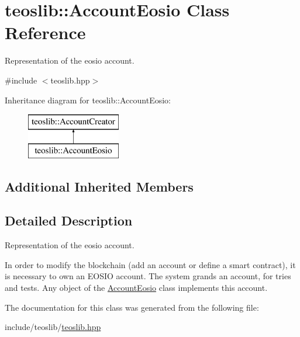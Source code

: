\hypertarget{classteoslib_1_1_account_eosio}{}\section{teoslib\+:\+:Account\+Eosio Class Reference}
\label{classteoslib_1_1_account_eosio}


Representation of the eosio account.  




{\ttfamily \#include $<$teoslib.\+hpp$>$}

Inheritance diagram for teoslib\+:\+:Account\+Eosio\+:\begin{figure}[H]
\begin{center}
\leavevmode
\includegraphics[height=2.000000cm]{classteoslib_1_1_account_eosio}
\end{center}
\end{figure}
\subsection*{Additional Inherited Members}


\subsection{Detailed Description}
Representation of the eosio account. 

In order to modify the blockchain (add an account or define a smart contract), it is necessary to own an E\+O\+S\+IO account. The system grands an account, for tries and tests. Any object of the \mbox{\hyperlink{classteoslib_1_1_account_eosio}{Account\+Eosio}} class implements this account. 

The documentation for this class was generated from the following file\+:\begin{DoxyCompactItemize}
\item 
include/teoslib/\mbox{\hyperlink{teoslib_8hpp}{teoslib.\+hpp}}\end{DoxyCompactItemize}
